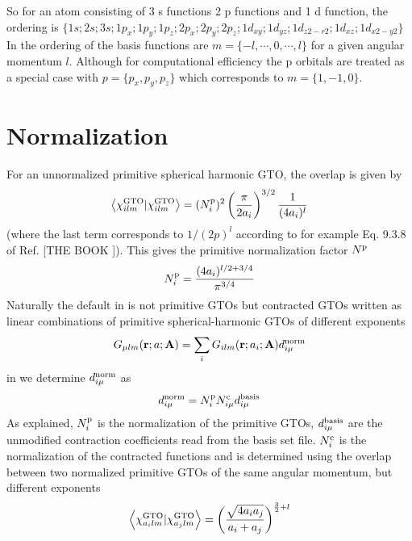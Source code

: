 So for an atom consisting of 3 s functions 2 p functions and 1 d function, the ordering is
$\{1s; 2s; 3s; 1p_{x};1p_{y};1p_{z}; 2p_{x};2p_{y};2p_{z}; 1d_{xy}; 1d_{yz}; 1d_{z2-r2} ; 1d_{xz}; 1d_{x2-y2}\}$
In {\lsdalton} the ordering of the basis functions are $m = \{-l,\cdots,0,\cdots,l\}$ for a given
angular momentum $l$. Although for computational efficiency the p orbitals are treated as a
special case with $p = \{ p_{x},p_{y},p_{z} \}$ which corresponds to $m = \{1,-1,0 \}$.

\section{Normalization}

For an unnormalized primitive spherical harmonic GTO, the overlap is given by
\begin{equation}
\left\langle \chi^{\text{GTO}}_{i lm} | \chi^{\text{GTO}}_{i lm} \right\rangle = (N_i^{\text{p}})^2 \left(\frac{\pi}{2a_i}\right)^{3/2}\frac{1}{(4a_i)^l}
\end{equation}
(where the last term corresponds to $1/(2p)^l$ according to for example Eq. 9.3.8 of Ref. [THE BOOK {\insertref}]). This gives 
the primitive normalization factor $N^{\text{p}}$
\begin{equation}
  N^{\text{p}}_i = \frac{(4a_i)^{l/2+3/4}}{\pi^{3/4}}
\end{equation}
Naturally the default in {\lsdalton} is not primitive GTOs but contracted GTOs written as linear combinations of primitive spherical-harmonic GTOs of different exponents
\begin{equation}
G_{\mu lm}(\textbf{r}; a;\textbf{A}) = \sum_{i} G_{ilm}(\textbf{r}; a_{i};\textbf{A})d^{\text{norm}}_{i\mu}
\end{equation}
in {\lsdalton} we determine $d^{\text{norm}}_{i\mu}$ as
\begin{equation}
d^{\text{norm}}_{i\mu} = N^{\text{p}}_{i}N^{\text{c}}_{i\mu}d^{\text{basis}}_{i\mu}
\end{equation}
As explained, $N^{\text{p}}_{i}$ is the normalization of the primitive GTOs, $d^{\text{basis}}_{i\mu}$ are the 
unmodified contraction coefficients read from the basis set file. $N^{\text{c}}_{i}$ is the normalization of the contracted functions and is determined using the overlap between two normalized primitive GTOs of the same angular momentum, but different exponents
\begin{eqnarray}
\left\langle \chi^{\text{GTO}}_{a_{i}lm} | \chi^{\text{GTO}}_{a_{j}lm} \right\rangle = \biggl( \frac{\sqrt{ 4 a_{i} a_{j}}}{a_{i}+a_{j}} \biggr)^{\frac{3}{2}+l}
\end{eqnarray}
